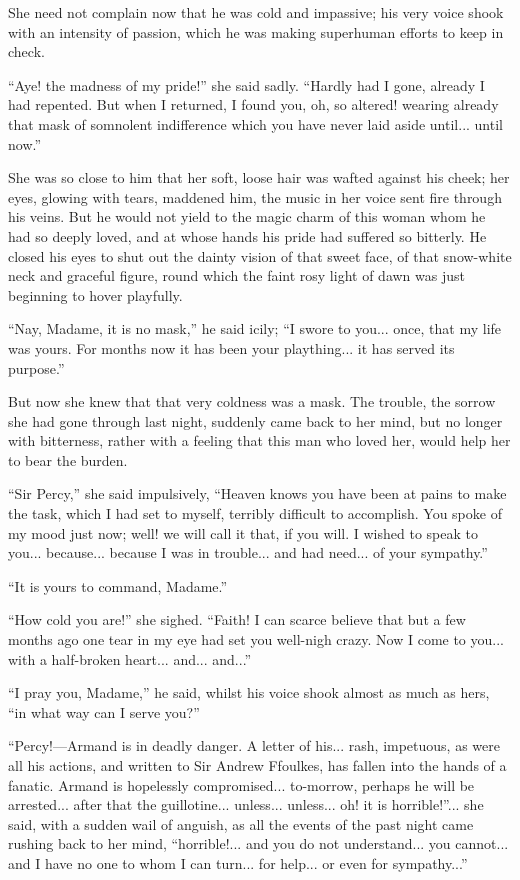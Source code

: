 \documentclass[paper=a5,BCOR=7mm,twoside,DIV=calc,12pt,usegeometry,chapterprefix,endperiod,headings=big]{scrbook}
\begin{document}
She need not complain now that he was cold and impassive; his very voice shook with an intensity of passion, which he was making superhuman efforts to keep in check.

\enquote{Aye! the madness of my pride!} she said sadly. \enquote{Hardly had I gone, already I had repented. But when I returned, I found you, oh, so altered! wearing already that mask of somnolent indifference which you have never laid aside until... until now.}

She was so close to him that her soft, loose hair was wafted against his cheek; her eyes, glowing with tears, maddened him, the music in her voice sent fire through his veins. But he would not yield to the magic charm of this woman whom he had so deeply loved, and at whose hands his pride had suffered so bitterly. He closed his eyes to shut out the dainty vision of that sweet face, of that snow-white neck and graceful figure, round which the faint rosy light of dawn was just beginning to hover playfully.

\enquote{Nay, Madame, it is no mask,} he said icily; \enquote{I swore to you... once, that my life was yours. For months now it has been your plaything... it has served its purpose.}

But now she knew that that very coldness was a mask. The trouble, the sorrow she had gone through last night, suddenly came back to her mind, but no longer with bitterness, rather with a feeling that this man who loved her, would help her to bear the burden.

\enquote{Sir Percy,} she said impulsively, \enquote{Heaven knows you have been at pains to make the task, which I had set to myself, terribly difficult to accomplish. You spoke of my mood just now; well! we will call it that, if you will. I wished to speak to you... because... because I was in trouble... and had need... of your sympathy.}

\enquote{It is yours to command, Madame.}

\enquote{How cold you are!} she sighed. \enquote{Faith! I can scarce believe that but a few months ago one tear in my eye had set you well-nigh crazy. Now I come to you... with a half-broken heart... and... and...}

\enquote{I pray you, Madame,} he said, whilst his voice shook almost as much as hers, \enquote{in what way can I serve you?}

\enquote{Percy!---Armand is in deadly danger. A letter of his... rash, impetuous, as were all his actions, and written to Sir Andrew Ffoulkes, has fallen into the hands of a fanatic. Armand is hopelessly compromised... to-morrow, perhaps he will be arrested... after that the guillotine... unless... unless... oh! it is horrible!}... she said, with a sudden wail of anguish, as all the events of the past night came rushing back to her mind, \enquote{horrible!... and you do not understand... you cannot... and I have no one to whom I can turn... for help... or even for sympathy...}
\end{document}
